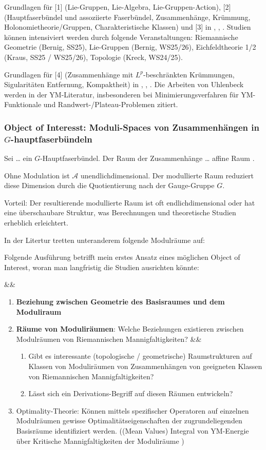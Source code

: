 \documentclass[10pt, letterpaper]{article}
\newenvironment{romanenum}[1][]
  {%
    \ifx&#1&
    \else
      \textbf{#1}\quad
    \fi
    \begin{enumerate}[label=\roman*)]
  }
  {%
    \end{enumerate}%
  }
\begin{document}
Grundlagen für [1] (Lie-Gruppen, Lie-Algebra, Lie-Gruppen-Action), [2] (Hauptfaserbündel und assoziierte Faserbündel, Zusammenhänge, Krümmung, Holonomietheorie/Gruppen, Charakteristische Klassen) und [3] in \cite{baum2014eichfeld}, \cite{hamilton2017gauge}, \cite{husemoller1975fibre}. Studien können intensiviert werden durch folgende Veranstaltungen: Riemannische Geometrie (Bernig, SS25), Lie-Gruppen (Bernig, WS25/26), Eichfeldtheorie 1/2 (Kraus, SS25 / WS25/26), Topologie (Kreck, WS24/25).

Grundlagen für [4] (Zusammenhänge mit $L^p$-beschränkten Krümmungen, Sigularitäten Entfernung, Kompaktheit) in \cite{uhlenbeck1982connections}, \cite{uhlenbeck1982removable}, \cite{wehrheim2021uhlenbeck}. Die Arbeiten von Uhlenbeck werden in der YM-Literatur, insbesonderen bei Minimierungsverfahren für YM-Funktionale und Randwert-/Plateau-Problemen zitiert.  



\subsubsection{Object of Interesst: Moduli-Spaces von Zusammenhängen in $G$-hauptfaserbündeln} 

Sei … ein $G$-Hauptfaserbündel. Der Raum der Zusammenhänge … affine Raum .

Ohne Modulation ist $\mathcal{A}$ unendlichdimensional. Der modullierte Raum reduziert diese Dimension durch die Quotientierung nach der Gauge-Gruppe $G$.

Vorteil: Der resultierende modullierte Raum ist oft endlichdimensional oder hat eine überschaubare Struktur, was Berechnungen und theoretische Studien erheblich erleichtert.

In der Litertur tretten unteranderem folgende Modulräume auf:




Folgende Ausführung betrifft mein erstes Ansatz eines möglichen Object of Interest, woran man langfristig die Studien ausrichten könnte: 

\begin{romanenum}
    \item \textbf{Beziehung zwischen Geometrie des Basisraumes und dem Moduliraum}
    \item \textbf{Räume von Moduliräumen}: Welche Beziehungen existieren zwischen Modulräumen von Riemannischen Mannigfaltigkeiten? 
    \begin{romanenum}
        \item Gibt es interessante (topologische / geometrische) Raumstrukturen auf Klassen von Moduliräumen von Zusammenhängen von geeigneten Klassen von Riemannischen Mannigfaltigkeiten? 
        \item Lässt sich ein Derivations-Begriff auf diesen Räumen entwickeln?
    \end{romanenum}
    \item Optimality-Theorie: Können mittels spezifischer Operatoren auf einzelnen Modulräumen gewisse Optimalitätseigenschaften der zugrundeliegenden Basisräume identifiziert werden. ((Mean Values) Integral von YM-Energie über Kritische Mannigfaltigkeiten der Moduliräume \cite{swoboda2018morse})
\end{romanenum}
\end{document}
